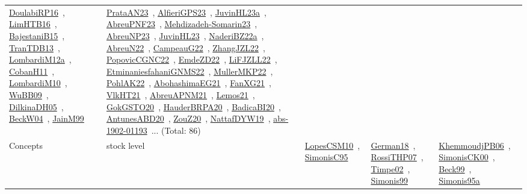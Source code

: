 {\begin{longtable}{lp{3cm}>{\raggedright\arraybackslash}p{6cm}>{\raggedright\arraybackslash}p{6cm}>{\raggedright\arraybackslash}p{8cm}}
\href{../works/DoulabiRP16.pdf}{DoulabiRP16}~\cite{DoulabiRP16}, \href{../works/LimHTB16.pdf}{LimHTB16}~\cite{LimHTB16}, \href{../works/BajestaniB15.pdf}{BajestaniB15}~\cite{BajestaniB15}, \href{../works/TranTDB13.pdf}{TranTDB13}~\cite{TranTDB13}, \href{../works/LombardiM12a.pdf}{LombardiM12a}~\cite{LombardiM12a}, \href{../works/CobanH11.pdf}{CobanH11}~\cite{CobanH11}, \href{../works/LombardiM10.pdf}{LombardiM10}~\cite{LombardiM10}, \href{../works/WuBB09.pdf}{WuBB09}~\cite{WuBB09}, \href{../works/DilkinaDH05.pdf}{DilkinaDH05}~\cite{DilkinaDH05}, \href{../works/BeckW04.pdf}{BeckW04}~\cite{BeckW04}, \href{../works/JainM99.pdf}{JainM99}~\cite{JainM99} & \href{../works/PrataAN23.pdf}{PrataAN23}~\cite{PrataAN23}, \href{../works/AlfieriGPS23.pdf}{AlfieriGPS23}~\cite{AlfieriGPS23}, \href{../works/JuvinHL23a.pdf}{JuvinHL23a}~\cite{JuvinHL23a}, \href{../works/AbreuPNF23.pdf}{AbreuPNF23}~\cite{AbreuPNF23}, \href{../works/Mehdizadeh-Somarin23.pdf}{Mehdizadeh-Somarin23}~\cite{Mehdizadeh-Somarin23}, \href{../works/AbreuNP23.pdf}{AbreuNP23}~\cite{AbreuNP23}, \href{../works/JuvinHL23.pdf}{JuvinHL23}~\cite{JuvinHL23}, \href{../works/NaderiBZ22a.pdf}{NaderiBZ22a}~\cite{NaderiBZ22a}, \href{../works/AbreuN22.pdf}{AbreuN22}~\cite{AbreuN22}, \href{../works/CampeauG22.pdf}{CampeauG22}~\cite{CampeauG22}, \href{../works/ZhangJZL22.pdf}{ZhangJZL22}~\cite{ZhangJZL22}, \href{../works/PopovicCGNC22.pdf}{PopovicCGNC22}~\cite{PopovicCGNC22}, \href{../works/EmdeZD22.pdf}{EmdeZD22}~\cite{EmdeZD22}, \href{../works/LiFJZLL22.pdf}{LiFJZLL22}~\cite{LiFJZLL22}, \href{../works/EtminaniesfahaniGNMS22.pdf}{EtminaniesfahaniGNMS22}~\cite{EtminaniesfahaniGNMS22}, \href{../works/MullerMKP22.pdf}{MullerMKP22}~\cite{MullerMKP22}, \href{../works/PohlAK22.pdf}{PohlAK22}~\cite{PohlAK22}, \href{../works/AbohashimaEG21.pdf}{AbohashimaEG21}~\cite{AbohashimaEG21}, \href{../works/FanXG21.pdf}{FanXG21}~\cite{FanXG21}, \href{../works/VlkHT21.pdf}{VlkHT21}~\cite{VlkHT21}, \href{../works/AbreuAPNM21.pdf}{AbreuAPNM21}~\cite{AbreuAPNM21}, \href{../works/Lemos21.pdf}{Lemos21}~\cite{Lemos21}, \href{../works/GokGSTO20.pdf}{GokGSTO20}~\cite{GokGSTO20}, \href{../works/HauderBRPA20.pdf}{HauderBRPA20}~\cite{HauderBRPA20}, \href{../works/BadicaBI20.pdf}{BadicaBI20}~\cite{BadicaBI20}, \href{../works/AntunesABD20.pdf}{AntunesABD20}~\cite{AntunesABD20}, \href{../works/ZouZ20.pdf}{ZouZ20}~\cite{ZouZ20}, \href{../works/NattafDYW19.pdf}{NattafDYW19}~\cite{NattafDYW19}, \href{../works/abs-1902-01193.pdf}{abs-1902-01193}~\cite{abs-1902-01193}... (Total: 86)\\
Concepts & stock level & \href{../works/LopesCSM10.pdf}{LopesCSM10}~\cite{LopesCSM10}, \href{../works/SimonisC95.pdf}{SimonisC95}~\cite{SimonisC95} & \href{../works/German18.pdf}{German18}~\cite{German18}, \href{../works/RossiTHP07.pdf}{RossiTHP07}~\cite{RossiTHP07}, \href{../works/Timpe02.pdf}{Timpe02}~\cite{Timpe02}, \href{../works/Simonis99.pdf}{Simonis99}~\cite{Simonis99} & \href{../works/KhemmoudjPB06.pdf}{KhemmoudjPB06}~\cite{KhemmoudjPB06}, \href{../works/SimonisCK00.pdf}{SimonisCK00}~\cite{SimonisCK00}, \href{../works/Beck99.pdf}{Beck99}~\cite{Beck99}, \href{../works/Simonis95a.pdf}{Simonis95a}~\cite{Simonis95a}\\

\end{longtable}}
